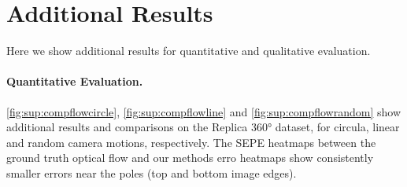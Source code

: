 \documentclass{bmvc2k}
\begin{document}
\section{Additional Results}

Here we show additional results for quantitative and qualitative evaluation.

\paragraph{Quantitative Evaluation.}

\cref{fig:sup:compflowcircle}, \cref{fig:sup:compflowline} and \cref{fig:sup:compflowrandom} show additional results and comparisons on the Replica 360° dataset, for circula, linear and random camera motions, respectively.
The SEPE heatmaps between the ground truth optical flow and our methods erro heatmaps show consistently smaller errors near the poles (top and bottom image edges).
\end{document}
